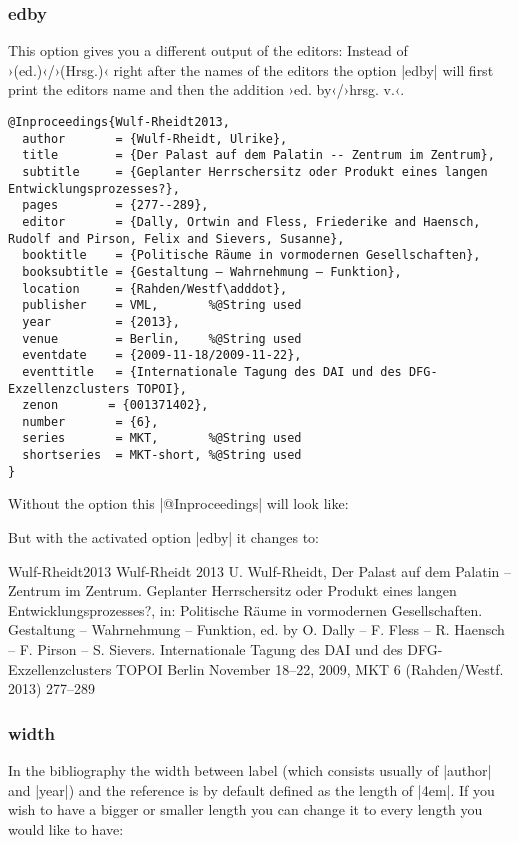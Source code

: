 \documentclass[a4paper,
10pt,
greek,
french,
spanish,
italian,
ngerman,
english
]{ltxdoc}
\begin{document}
\subsubsection{edby}\label{edby}
This option gives you a different output of the editors: Instead of ›(ed.)‹/›(Hrsg.)‹ right after the names of the editors  the option |edby| will first print the editors name and then the addition ›ed. by‹/›hrsg. v.‹.

\begin{lstlisting}[style=bibentry,label=Wulf-Rheidt2013,caption={{@}Inproceedings\{Wulf-Rheidt2013,…\} }]
@Inproceedings{Wulf-Rheidt2013,
  author       = {Wulf-Rheidt, Ulrike},
  title        = {Der Palast auf dem Palatin -- Zentrum im Zentrum},
  subtitle     = {Geplanter Herrschersitz oder Produkt eines langen Entwicklungsprozesses?},
  pages        = {277--289},
  editor       = {Dally, Ortwin and Fless, Friederike and Haensch, Rudolf and Pirson, Felix and Sievers, Susanne},
  booktitle    = {Politische Räume in vormodernen Gesellschaften},
  booksubtitle = {Gestaltung – Wahrnehmung – Funktion},
  location     = {Rahden/Westf\adddot},
  publisher    = VML,		%@String used
  year         = {2013},
  venue        = Berlin, 	%@String used
  eventdate    = {2009-11-18/2009-11-22},
  eventtitle   = {Internationale Tagung des DAI und des DFG-Exzellenzclusters TOPOI},
  zenon       = {001371402},
  number       = {6},
  series       = MKT,		%@String used
  shortseries  = MKT-short,	%@String used
}
\end{lstlisting}
Without the option this |@Inproceedings| will look like:
 

 But with the activated option  |edby| it changes to:
 \begin{bibbsp}{Wulf-Rheidt2013}
Wulf-Rheidt 2013\hspace{3em} U. Wulf-Rheidt, Der Palast auf dem Palatin – Zentrum im Zentrum. Geplanter Herrschersitz oder Produkt eines langen Entwicklungsprozesses?, in:  {\color{red}Politische Räume in vormodernen Gesellschaften. Gestaltung – Wahrnehmung – Funktion, ed. by O. Dally – F. Fless – R. Haensch – F. Pirson – S. Sievers}. Internationale Tagung des DAI und des DFG-Exzellenzclusters TOPOI Berlin November 18–22, 2009, MKT 6 (Rahden/Westf. 2013) 277–289
 \end{bibbsp}
 
 
\subsubsection{width}\label{width}
In the bibliography the width between label (which consists usually of |author| and |year|) and the reference is  by default defined as the length of |4em|. 
If you wish to have a bigger or smaller length you can change it to every length you would like to have:
\end{document}

